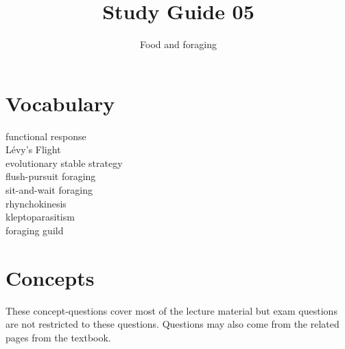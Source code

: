 \documentclass[nofonts, letterpaper]{tufte-handout}
\title{Study Guide 05}
\author{Food and foraging}
\date{} %
\begin{document}
\maketitle	%


\section{Vocabulary}
\vspace{-1\baselineskip}
\begin{multicols}{2}
\noindent functional response \\
Lévy's Flight \\
evolutionary stable strategy \\
flush-pursuit foraging \\
sit-and-wait foraging \\
rhynchokinesis  \\
kleptoparasitism \\
foraging guild 
\end{multicols}

\section{Concepts}

These concept-questions cover most of the lecture material but exam questions are not restricted to these questions. Questions may also come from the related pages from the textbook.\vspace{\baselineskip}
\end{document}
